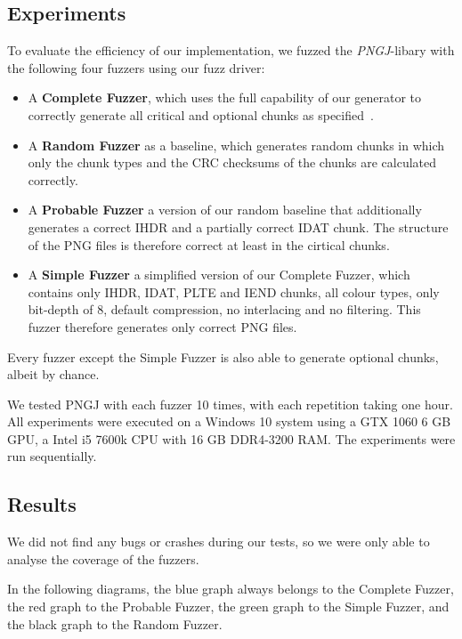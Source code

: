\documentclass[runningheads]{llncs}
\begin{document}
\subsection{Experiments}
To evaluate the efficiency of our implementation, we fuzzed the \textit{PNGJ}-libary with the following four fuzzers using our fuzz driver:
\begin{itemize}
    \item A \textbf{Complete Fuzzer}, which uses the full capability of our generator to correctly generate all critical and optional chunks as specified~\cite{libpng_chunks}.
    \item A \textbf{Random Fuzzer} as a baseline, which generates random chunks in which only the chunk types and the CRC checksums of the chunks are calculated correctly.
    \item A \textbf{Probable Fuzzer} a version of our random baseline that additionally generates a correct IHDR and a partially correct IDAT chunk. The structure of the PNG files is therefore correct at least in the cirtical chunks.
    \item A \textbf{Simple Fuzzer} a simplified version of our Complete Fuzzer, which contains only IHDR, IDAT, PLTE and IEND chunks, all colour types, only bit-depth of 8, default compression, no interlacing and no filtering. This fuzzer therefore generates only correct PNG files.

\end{itemize}
Every fuzzer except the Simple Fuzzer is also able to generate optional chunks, albeit by chance.

We tested PNGJ with each fuzzer 10 times, with each repetition taking one hour. All experiments were executed on a Windows 10 system using a GTX 1060 6 GB GPU, a Intel i5 7600k CPU with 16 GB DDR4-3200 RAM. The experiments were run sequentially.

\subsection{Results}
We did not find any bugs or crashes during our tests, so we were only able to analyse the coverage of the fuzzers.

In the following diagrams, the blue graph always belongs to the Complete Fuzzer, the red graph to the Probable Fuzzer, the green graph to the Simple Fuzzer, and the black graph to the Random Fuzzer.
\end{document}
